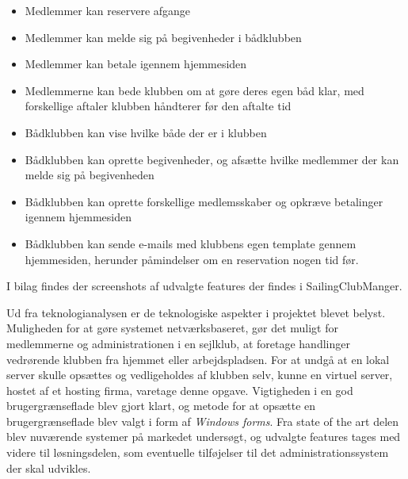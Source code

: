 \begin{itemize}
	\item Medlemmer kan reservere afgange
	\item Medlemmer kan melde sig på begivenheder i bådklubben
	\item Medlemmer kan betale igennem hjemmesiden
	\item Medlemmerne kan bede klubben om at gøre deres egen båd klar, med forskellige aftaler klubben håndterer
        før den aftalte tid
	\item Bådklubben kan vise hvilke både der er i klubben
	\item Bådklubben kan oprette begivenheder, og afsætte hvilke medlemmer der kan melde sig på begivenheden
	\item Bådklubben kan oprette forskellige medlemsskaber og opkræve betalinger igennem hjemmesiden
	\item Bådklubben kan sende e-mails med klubbens egen template gennem hjemmesiden, herunder påmindelser om en
        reservation nogen tid før.
\end{itemize}

I bilag  findes der screenshots af udvalgte features der findes i SailingClubManger.


Ud fra teknologianalysen er de teknologiske aspekter i projektet blevet belyst. Muligheden for at gøre systemet
netværksbaseret, gør det muligt for medlemmerne og administrationen i en sejlklub, at foretage handlinger vedrørende
klubben fra hjemmet eller arbejdspladsen. For at undgå at en lokal server skulle opsættes og vedligeholdes af klubben
selv, kunne en virtuel server, hostet af et hosting firma, varetage denne opgave. Vigtigheden i en god brugergrænseflade
blev gjort klart, og metode for at opsætte en brugergrænseflade blev valgt i form af \textit{Windows forms}. Fra state
of the art delen blev nuværende systemer på markedet undersøgt, og udvalgte features tages med videre til løsningsdelen,
som eventuelle tilføjelser til det administrationssystem der skal udvikles.


